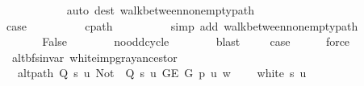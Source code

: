 \begin{isabellebody}
\ \ \ \ \ \ \ \ \ \ \isamarkupfalse%
\ {\isacharparenleft}{\kern0pt}auto\ dest{\isacharcolon}{\kern0pt}\ walk{\isacharunderscore}{\kern0pt}between{\isacharunderscore}{\kern0pt}nonempty{\isacharunderscore}{\kern0pt}path{\isacharparenleft}{\kern0pt}{}{\isacharparenright}{\kern0pt}{\isacharparenright}{\kern0pt}\isanewline
\ \ \ \ \ \ \isamarkupfalse%
\isanewline
\ \ \ \ \isamarkupfalse%
\isanewline
\ \ \ \ \ \ \isamarkupfalse%
\ {}\isanewline
\ \ \ \ \ \ \isamarkupfalse%
\ {\isacharquery}{\kern0pt}case\isanewline
\ \ \ \ \ \ \ \ \isamarkupfalse%
\ c{\isacharunderscore}{\kern0pt}path\isanewline
\ \ \ \ \ \ \ \ \isamarkupfalse%
\ {\isacharparenleft}{\kern0pt}simp\ add{\isacharcolon}{\kern0pt}\ walk{\isacharunderscore}{\kern0pt}between{\isacharunderscore}{\kern0pt}nonempty{\isacharunderscore}{\kern0pt}path{\isacharparenleft}{\kern0pt}{}{\isacharcomma}{\kern0pt}\ {}{\isacharparenright}{\kern0pt}{\isacharparenright}{\kern0pt}\isanewline
\ \ \ \ \isamarkupfalse%
\isanewline
\ \ \ \ \isamarkupfalse%
\ \isamarkupfalse%
\ False\isanewline
\ \ \ \ \ \ \isamarkupfalse%
\ no{\isacharunderscore}{\kern0pt}odd{\isacharunderscore}{\kern0pt}cycle\isanewline
\ \ \ \ \ \ \isamarkupfalse%
\ blast\ \isacommand{{\isacharbraceright}{\kern0pt}}\isamarkupfalse%
\isanewline
\ \ \isamarkupfalse%
\ {\isacharquery}{\kern0pt}case\isanewline
\ \ \ \ \isamarkupfalse%
\ force\isanewline
{}\isamarkupfalse%
%
\endisatagproof
{\isafoldproof}%
%
\isadelimproof
\isanewline
%
\endisadelimproof
\isanewline
{}\isamarkupfalse%
\ {\isacharparenleft}{\kern0pt}\ alt{\isacharunderscore}{\kern0pt}bfs{\isacharunderscore}{\kern0pt}invar{\isacharparenright}{\kern0pt}\ white{\isacharunderscore}{\kern0pt}imp{\isacharunderscore}{\kern0pt}gray{\isacharunderscore}{\kern0pt}ancestor{\isacharcolon}{\kern0pt}\isanewline
\ \ \ {\isachardoublequoteopen}alt{\isacharunderscore}{\kern0pt}path\ {\isacharparenleft}{\kern0pt}Q\ s\ u{\isacharparenright}{\kern0pt}\ {\isacharparenleft}{\kern0pt}Not\ {\isasymcirc}\ Q\ s\ u{\isacharparenright}{\kern0pt}\ {\isacharparenleft}{\kern0pt}G{\isachardot}{\kern0pt}E\ G{\isacharparenright}{\kern0pt}\ p\ u\ w{\isachardoublequoteclose}\isanewline
\ \ \ {\isachardoublequoteopen}{\isasymnot}\ white\ s\ u{\isachardoublequoteclose}\isanewline

\end{isabellebody}
